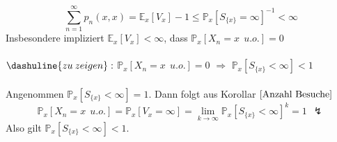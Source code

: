 \begin{itemize}
\begin{equation*}
\sum_{n=1}^{\infty} p_{n}(x,x) = \mathbb{E}_{x}[V_{x}] - 1 \leq \mathbb{P}_{x}[S_{\lbrace x \rbrace} = \infty]^{-1} < \infty
\end{equation*}
Insbesondere impliziert $\mathbb{E}_{x}[V_{x}] < \infty$, dass $\mathbb{P}_{x}[X_{n} = x \: \: u.o.] = 0$
\\
\\
$\dashuline{zu \: zeigen}:$ $\mathbb{P}_{x}[X_{n} = x \: \: u.o.] = 0$ $\Rightarrow$ $\mathbb{P}_{x}[S_{\lbrace x \rbrace} < \infty] < 1$
\\
\\
Angenommen $\mathbb{P}_{x}[S_{\lbrace x \rbrace} < \infty] = 1$. Dann folgt aus Korollar $\ref{Anzahl Besuche}$
\begin{equation*}
\mathbb{P}_{x}[X_{n} = x \: \: u.o.] = \mathbb{P}_{x}[V_{x} = \infty] = \lim_{k \to \infty} \mathbb{P}_{x}[S_{\lbrace x \rbrace} < \infty]^{k} = 1 \: \: \lightning
\end{equation*}
Also gilt $\mathbb{P}_{x}[S_{\lbrace x \rbrace} < \infty] < 1$.
\end{itemize}